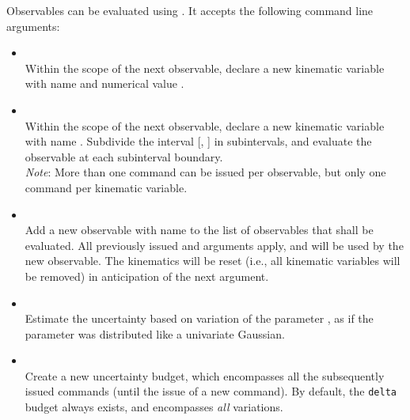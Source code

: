 Observables can be evaluated using . It accepts
the following command line arguments:
\begin{itemize}
    \item[] \\[\medskipamount]
        Within the scope of the next observable, declare a new kinematic
        variable with name  and numerical value .

    \item[] \\[\medskipamount]
        Within the scope of the next observable, declare a new kinematic
        variable with name . Subdivide the interval [, ]
        in  subintervals, and evaluate the observable at each subinterval
        boundary.\\

        \emph{Note}: More than one  command can be issued per
        observable, but only one  command per kinematic variable.

    \item[] \\[\medskipamount]
        Add a new observable with name  to the list of observables
        that shall be evaluated. All previously issued 
        and  arguments apply, and will be used by the new observable.
        The kinematics will be reset (i.e., all kinematic variables will be removed)
        in anticipation of the next  argument.

    \item[] \\[\medskipamount]
        Estimate the uncertainty based on variation of the parameter ,
        as if the parameter was distributed like a univariate Gaussian.

    \item[] \\[\medskipamount]
        Create a new uncertainty budget, which encompasses all the subsequently issued
         commands (until the issue of a new  command).
        By default, the \texttt{delta} budget always exists, and encompasses \emph{all}
        variations.
\end{itemize}

